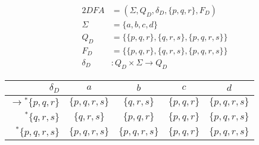 \documentclass[docid=TP04]{tcom_TP}
\begin{document}
{\begin{center}
\begin{minipage}[c]{0.6\textwidth}
\begin{center}
		\end{center}
	\end{minipage}%
\end{center}
\begin{center}
	\begin{minipage}[c]{0.4\textwidth}
		\begin{alignat*}{2}
			DFA       &= (\Sigma, Q_D, \delta_D, \{p,q,r\}, F_D)\\
			\Sigma    &= \{a,b,c,d\}\\
			Q_D       &= \{\{p,q,r\},\{q,r,s\},\{p,q,r,s\}\}\\
			F_D       &= \{\{p,q,r\},\{q,r,s\},\{p,q,r,s\}\}\\
			\delta_D &\colon Q_D \times \Sigma \rightarrow Q_D
		\end{alignat*}
	\end{minipage}%
	\begin{minipage}[c]{0.6\textwidth}
		\begin{center}
		\begin{tabular}{ r | c c c c }
			$\delta_D                    $ & $a          $ & $b          $ & $c          $ & $d          $ \\ \hline
			$\rightarrow{^*} \{p,q,r  \}$ & $\{p,q,r,s\}$ & $\{  q,r,s\}$ & $\{p,q,r  \}$ & $\{p,q,r,s\}$ \\
			$           {^*} \{  q,r,s\}$ & $\{  q,r,s\}$ & $\{p,q,r  \}$ & $\{p,q,r  \}$ & $\{p,q,r,s\}$ \\
			$           {^*} \{p,q,r,s\}$ & $\{p,q,r,s\}$ & $\{p,q,r,s\}$ & $\{p,q,r  \}$ & $\{p,q,r,s\}$ \\
		\end{tabular}
		\end{center}
	\end{minipage}%
\end{center}
}
\end{document}
